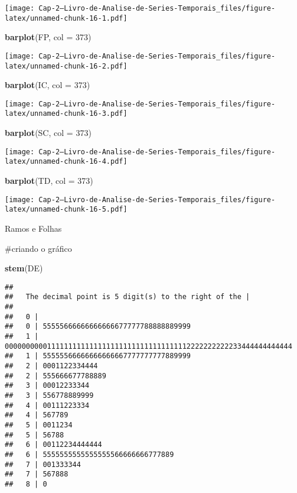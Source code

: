 \documentclass[]{article}
\newenvironment{Shaded}{\begin{snugshade}}{\end{snugshade}}
\newcommand{\DataTypeTok}[1]{\textcolor[rgb]{0.13,0.29,0.53}{#1}}
\newcommand{\DecValTok}[1]{\textcolor[rgb]{0.00,0.00,0.81}{#1}}
\newcommand{\KeywordTok}[1]{\textcolor[rgb]{0.13,0.29,0.53}{\textbf{#1}}}
\newcommand{\NormalTok}[1]{#1}
\begin{document}
\texttt{[image: Cap-2---Livro-de-Analise-de-Series-Temporais\_files/figure-latex/unnamed-chunk-16-1.pdf]}

\begin{Shaded}
\begin{Highlighting}[]
\KeywordTok{barplot}\NormalTok{(FP, }\DataTypeTok{col =} \DecValTok{373}\NormalTok{)}
\end{Highlighting}
\end{Shaded}

\texttt{[image: Cap-2---Livro-de-Analise-de-Series-Temporais\_files/figure-latex/unnamed-chunk-16-2.pdf]}

\begin{Shaded}
\begin{Highlighting}[]
\KeywordTok{barplot}\NormalTok{(IC, }\DataTypeTok{col =} \DecValTok{373}\NormalTok{)}
\end{Highlighting}
\end{Shaded}

\texttt{[image: Cap-2---Livro-de-Analise-de-Series-Temporais\_files/figure-latex/unnamed-chunk-16-3.pdf]}

\begin{Shaded}
\begin{Highlighting}[]
\KeywordTok{barplot}\NormalTok{(SC, }\DataTypeTok{col =} \DecValTok{373}\NormalTok{)}
\end{Highlighting}
\end{Shaded}

\texttt{[image: Cap-2---Livro-de-Analise-de-Series-Temporais\_files/figure-latex/unnamed-chunk-16-4.pdf]}

\begin{Shaded}
\begin{Highlighting}[]
\KeywordTok{barplot}\NormalTok{(TD, }\DataTypeTok{col =} \DecValTok{373}\NormalTok{)}
\end{Highlighting}
\end{Shaded}

\texttt{[image: Cap-2---Livro-de-Analise-de-Series-Temporais\_files/figure-latex/unnamed-chunk-16-5.pdf]}

Ramos e Folhas

\#criando o gráfico

\begin{Shaded}
\begin{Highlighting}[]
\KeywordTok{stem}\NormalTok{(DE)}
\end{Highlighting}
\end{Shaded}

\begin{verbatim}
## 
##   The decimal point is 5 digit(s) to the right of the |
## 
##   0 | 
##   0 | 55555666666666666677777788888889999
##   1 | 00000000001111111111111111111111111111111112222222222233444444444444
##   1 | 55555566666666666667777777777889999
##   2 | 0001122334444
##   2 | 555666677788889
##   3 | 00012233344
##   3 | 556778889999
##   4 | 00111223334
##   4 | 567789
##   5 | 0011234
##   5 | 56788
##   6 | 00112234444444
##   6 | 5555555555555555566666666777889
##   7 | 001333344
##   7 | 567888
##   8 | 0
\end{verbatim}
\end{document}
